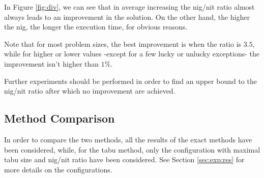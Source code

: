 \documentclass{article}
\begin{document}
In Figure \ref{fig:div}, we can see that in average increasing the nig/nit ratio almost always leads to an improvement in the solution.
On the other hand, the higher the nig, the longer the execution time, for obvious reasons.

Note that for most problem sizes, the best improvement is when the ratio is $3.5$, while for higher or lower values -except for a few lucky or unlucky exceptions- the improvement isn't higher than $1\%$.

Further experiments should be performed in order to find an upper bound to the nig/nit ratio after which no improvement are achieved.

\subsection{Method Comparison}
In order to compare the two methods, all the results of the exact methods have been considered, while, for the tabu method, only the configuration with maximal tabu size and nig/nit ratio have been considered.
See Section \ref{sec:exp:res} for more details on the configurations.
\end{document}
